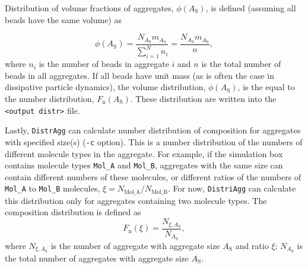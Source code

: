 Distribution of volume fractions of aggregates, $\phi(A_{\mathrm{S}})$, is
defined (assuming all beads have the same volume) as

\begin{equation} \label{eq:Fvol}
  \phi(A_{\mathrm{S}}) = \frac{N_{A_{\mathrm{S}} } m_{A_{\mathrm{S}} }}{\sum_{i=1}^N n_i} =
  \frac{N_{A_{\mathrm{S}} } m_{A_{\mathrm{S}} }}{n},
\end{equation}
where $n_i$ is the number of beads in aggregate $i$ and $n$ is the total
number of beads in all aggregates. If all beads have unit mass (as is often
the case in dissipative particle dynamics), the volume distribution,
$\phi(A_{\mathrm{S}})$, is the equal to the number distribution,
$F_{\mathrm{n}}(A_{\mathrm{S}})$.
These distribution are written into the \texttt{<output distr>} file.

Lastly, \texttt{DistrAgg} can calculate number distribution of composition
for aggregates with specified size(s) (\texttt{-c} option). This is a number
distribution of the numbers of different molecule types in the aggregate.
For example, if the simulation box contains molecule types \texttt{Mol\_A}
and \texttt{Mol\_B}, aggregates with the same size can contain different
numbers of these molecules, or different ratios of the numbers of
\texttt{Mol\_A} to \texttt{Mol\_B} molecules,
$\xi=N_{\mathrm{Mol\_A}}/N_{\mathrm{Mol\_B}}$. For now, \texttt{DistriAgg}
can calculate this distribution only for aggregates containing two molecule
types. The composition distribution is defined as
\begin{equation} \label{eq:CompDistr}
  F_{\mathrm{n}}(\xi) = \frac{N_{\xi,A_{\mathrm{S}} }}{N_{A_{\mathrm{S}}} },
\end{equation}
where $N_{\xi,A_{\mathrm{S}} }$ is the number of aggregate with aggregate
size $A_{\mathrm{S}}$ and ratio $\xi$; $N_{A_{\mathrm{S}}}$ is the total
number of aggregates with aggregate size $A_{\mathrm{S}}$.

